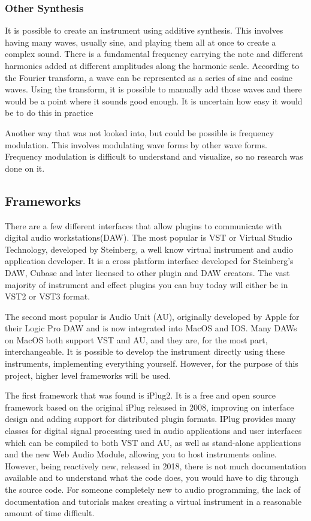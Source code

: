 \documentclass[12pt]{article}
\begin{document}
	\subsubsection{Other Synthesis}
	It is possible to create an instrument using additive synthesis. This involves having many waves, usually sine, and playing them all at once to create a complex sound.
	There is a fundamental frequency carrying the note and different harmonics added at different amplitudes along the harmonic scale. According to the Fourier transform, a wave 
	can be represented as a series of sine and cosine waves. Using the transform, it is possible to manually add those waves and there would be a point where it sounds good
	enough. It is uncertain how easy it would be to do this in practice
	
	Another way that was not looked into, but could be possible is frequency modulation. This involves modulating wave forms by other wave forms. Frequency modulation is
	difficult to understand and visualize, so no research was done on it.
	


	\subsection{Frameworks}
	There are a few different interfaces that allow plugins to communicate with digital audio workstations(DAW). 
	The most popular is VST or Virtual Studio Technology, developed by Steinberg, a well know virtual instrument and audio application developer. 
	It is a cross platform interface developed for Steinberg's DAW, Cubase and later licensed to other plugin and DAW creators.
	The vast majority of instrument and effect plugins you can buy today will either be in VST2 or VST3 format. 
	
	The second most popular is Audio Unit (AU), originally developed by Apple for their Logic Pro DAW and is now integrated into MacOS and IOS. 
	Many DAWs on MacOS both support VST and AU, and they are, for the most part, interchangeable. 
	It is possible to develop the instrument directly using these instruments, implementing everything yourself. However, for the purpose of this project, 
	higher level frameworks will be used.
	
	The first framework that was found is iPlug2. It is a free and open source framework based on the original iPlug released in 2008, improving on interface design 
	and adding support for distributed plugin formats. IPlug provides many classes for digital signal processing used in audio applications and user interfaces which can be
	compiled to both VST and AU, as well as stand-alone applications and the new Web Audio Module, allowing you to host instruments online.
	However, being reactively new, released in 2018, there is not much documentation available and to understand what the code does, you would have to dig through the source code.
	For someone completely new to audio programming, the lack of documentation and tutorials makes creating a virtual instrument in a reasonable amount of time difficult.
	
\end{document}
